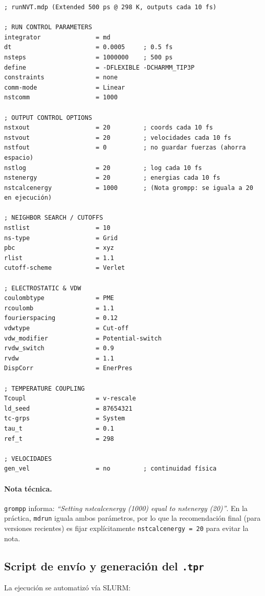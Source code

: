 \documentclass[12pt,a4paper]{article}
\begin{document}
\begin{Verbatim}[fontsize=\footnotesize,frame=single]
; runNVT.mdp (Extended 500 ps @ 298 K, outputs cada 10 fs)

; RUN CONTROL PARAMETERS
integrator               = md
dt                       = 0.0005     ; 0.5 fs
nsteps                   = 1000000    ; 500 ps
define                   = -DFLEXIBLE -DCHARMM_TIP3P
constraints              = none
comm-mode                = Linear
nstcomm                  = 1000

; OUTPUT CONTROL OPTIONS
nstxout                  = 20         ; coords cada 10 fs
nstvout                  = 20         ; velocidades cada 10 fs
nstfout                  = 0          ; no guardar fuerzas (ahorra espacio)
nstlog                   = 20         ; log cada 10 fs
nstenergy                = 20         ; energias cada 10 fs
nstcalcenergy            = 1000       ; (Nota grompp: se iguala a 20 en ejecución)

; NEIGHBOR SEARCH / CUTOFFS
nstlist                  = 10
ns-type                  = Grid
pbc                      = xyz
rlist                    = 1.1
cutoff-scheme            = Verlet

; ELECTROSTATIC & VDW
coulombtype              = PME
rcoulomb                 = 1.1
fourierspacing           = 0.12
vdwtype                  = Cut-off
vdw_modifier             = Potential-switch
rvdw_switch              = 0.9
rvdw                     = 1.1
DispCorr                 = EnerPres

; TEMPERATURE COUPLING
Tcoupl                   = v-rescale
ld_seed                  = 87654321
tc-grps                  = System
tau_t                    = 0.1
ref_t                    = 298

; VELOCIDADES
gen_vel                  = no         ; continuidad física
\end{Verbatim}

\paragraph{Nota técnica.} \texttt{grompp} informa: \emph{``Setting nstcalcenergy (1000) equal to nstenergy (20)''}. En la práctica, \texttt{mdrun} iguala ambos parámetros, por lo que la recomendación final (para versiones recientes) es fijar explícitamente \texttt{nstcalcenergy = 20} para evitar la nota.

\subsection{Script de envío y generación del \texttt{.tpr}}
La ejecución se automatizó vía SLURM:
\end{document}

